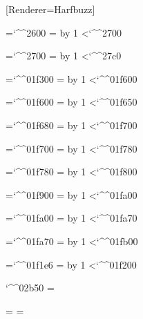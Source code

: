 \usepackage{fontspec}
\usepackage{xeCJK}


\newfontfamily{}[Renderer=Harfbuzz]

\newXeTeXintercharclass\emojiclass

=`\^^2600
\loop
  \XeTeXcharclass{}=\emojiclass
  \advance{} by 1
  \ifnum{}<`\^^2700
\repeat

=`\^^2700
\loop
  \XeTeXcharclass{}=\emojiclass
  \advance{} by 1
  \ifnum{}<`\^^27c0
\repeat

=`\^^01f300
\loop
  \XeTeXcharclass{}=\emojiclass
  \advance{} by 1
  \ifnum{}<`\^^01f600
\repeat

=`\^^01f600
\loop
  \XeTeXcharclass{}=\emojiclass
  \advance{} by 1
  \ifnum{}<`\^^01f650
\repeat

=`\^^01f680
\loop
  \XeTeXcharclass{}=\emojiclass
  \advance{} by 1
  \ifnum{}<`\^^01f700
\repeat

=`\^^01f700
\loop
  \XeTeXcharclass{}=\emojiclass
  \advance{} by 1
  \ifnum{}<`\^^01f780
\repeat

=`\^^01f780
\loop
  \XeTeXcharclass{}=\emojiclass
  \advance{} by 1
  \ifnum{}<`\^^01f800
\repeat

=`\^^01f900
\loop
  \XeTeXcharclass{}=\emojiclass
  \advance{} by 1
  \ifnum{}<`\^^01fa00
\repeat

=`\^^01fa00
\loop
  \XeTeXcharclass{}=\emojiclass
  \advance{} by 1
  \ifnum{}<`\^^01fa70
\repeat

=`\^^01fa70
\loop
  \XeTeXcharclass{}=\emojiclass
  \advance{} by 1
  \ifnum{}<`\^^01fb00
\repeat

=`\^^01f1e6
\loop
  \XeTeXcharclass{}=\emojiclass
  \advance{} by 1
  \ifnum{}<`\^^01f200
\repeat

\XeTeXcharclass `\^^02b50 = \emojiclass

 \emojiclass = {\emojifont}
 \emojiclass = {\emojifont}

